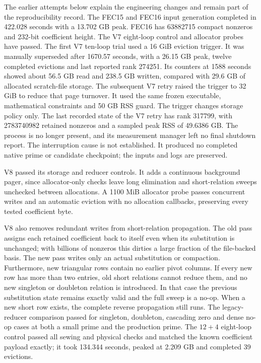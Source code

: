 \documentclass[11pt]{article}
\begin{document}
The earlier attempts below explain the engineering changes and remain part
of the reproducibility record.
The FEC15 and FEC16 input generation completed in 422.028 seconds with a
13.702 GB peak. FEC16 has 63882715 compact nonzeros and 232-bit coefficient
height. The V7 eight-loop control and allocator probes have passed.
The first V7 ten-loop trial used a 16 GiB eviction trigger. It was manually
superseded after 1670.57 seconds, with a 26.15 GB peak, twelve completed
evictions and last reported rank 274251. Its counters at 1588 seconds showed
about 56.5 GB read and 238.5 GB written, compared with 29.6 GB of allocated
scratch-file storage. The subsequent V7 retry raised the trigger to 32 GiB to
reduce that page turnover. It used the same frozen executable, mathematical
constraints and 50 GB RSS guard. The trigger changes storage policy only.
The last recorded state of the V7 retry has rank 317799, with 2783740982
retained nonzeros and a sampled peak RSS of 49.6386 GB. The process is no
longer present, and its measurement manager left no final shutdown report.
The interruption cause is not established. It produced no completed native
prime or candidate checkpoint; the inputs and logs are preserved.

V8 passed its storage and reducer controls. It adds a continuous
background pager, since allocator-only checks leave long elimination and
short-relation sweeps unchecked between allocations. A 1100 MiB allocator
probe passes concurrent writes and an automatic eviction with no allocation
callbacks, preserving every tested coefficient byte.

V8 also removes redundant writes from short-relation propagation. The old
pass assigns each retained coefficient back to itself even when its
substitution is unchanged; with billions of nonzeros this dirties a large
fraction of the file-backed basis. The new pass writes only an actual
substitution or compaction. Furthermore, new triangular rows contain no
earlier pivot columns. If every new row has more than two entries, old short
relations cannot reduce them, and no new singleton or doubleton relation is
introduced. In that case the previous substitution state remains exactly
valid and the full sweep is a no-op. When a new short row exists, the
complete reverse propagation still runs. The legacy-reducer comparison passed for singleton, doubleton, cascading
zero and dense no-op cases at both a small prime and the production prime.
The $12+4$ eight-loop control passed all sewing and physical checks and
matched the known coefficient payload exactly; it took 134.344 seconds,
peaked at 2.209 GB and completed 39 evictions.
\end{document}
